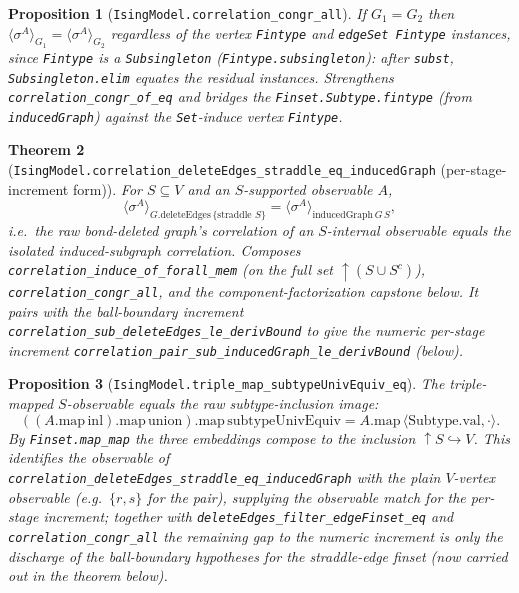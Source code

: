 \documentclass[a4paper,11pt]{article}
\newtheorem{theorem}{Theorem}
\newtheorem{proposition}[theorem]{Proposition}
\begin{document}
\begin{proposition}[\texttt{IsingModel.correlation\_congr\_all}]
If $G_1=G_2$ then
$\langle\sigma^{A}\rangle_{G_1}=\langle\sigma^{A}\rangle_{G_2}$ regardless of the
vertex \texttt{Fintype} and \texttt{edgeSet Fintype} instances, since
\texttt{Fintype} is a \texttt{Subsingleton} (\texttt{Fintype.subsingleton}):
after \texttt{subst}, \texttt{Subsingleton.elim} equates the residual instances.
Strengthens \texttt{correlation\_congr\_of\_eq} and bridges the
\texttt{Finset.Subtype.fintype} (from \texttt{inducedGraph}) against the
\texttt{Set}-induce vertex \texttt{Fintype}.
\end{proposition}

\begin{theorem}[\texttt{IsingModel.correlation\_deleteEdges\_straddle\_eq\_inducedGraph}
(per-stage-increment form)]
For $S\subseteq V$ and an $S$-supported observable $A$,
\[
  \langle\sigma^{A}\rangle_{G.\mathrm{deleteEdges}\,\{\text{straddle }S\}}
    = \langle\sigma^{A}\rangle_{\mathrm{inducedGraph}\,G\,S},
\]
i.e.\ the \emph{raw} bond-deleted graph's correlation of an $S$-internal
observable equals the isolated induced-subgraph correlation. Composes
\texttt{correlation\_induce\_of\_forall\_mem} (on the full set
$\uparrow(S\cup S^{c})$), \texttt{correlation\_congr\_all}, and the
component-factorization capstone below. It pairs with the ball-boundary
increment \texttt{correlation\_sub\_deleteEdges\_le\_derivBound} to give the
numeric per-stage increment
\texttt{correlation\_pair\_sub\_inducedGraph\_le\_derivBound} (below).
\end{theorem}

\begin{proposition}[\texttt{IsingModel.triple\_map\_subtypeUnivEquiv\_eq}]
The triple-mapped $S$-observable equals the raw subtype-inclusion image:
\[
  ((A.\mathrm{map}\,\mathrm{inl}).\mathrm{map}\,\mathrm{union})
    .\mathrm{map}\,\mathrm{subtypeUnivEquiv}
  = A.\mathrm{map}\,\langle\mathrm{Subtype.val},\cdot\rangle.
\]
By \texttt{Finset.map\_map} the three embeddings compose to the inclusion
$\uparrow S\hookrightarrow V$. This identifies the observable of
\texttt{correlation\_deleteEdges\_straddle\_eq\_inducedGraph} with the plain
$V$-vertex observable (e.g.\ $\{r,s\}$ for the pair), supplying the observable
match for the per-stage increment; together with
\texttt{deleteEdges\_filter\_edgeFinset\_eq} and \texttt{correlation\_congr\_all}
the remaining gap to the numeric increment is only the discharge of the
ball-boundary hypotheses for the straddle-edge finset (now carried out in the
theorem below).
\end{proposition}
\end{document}
